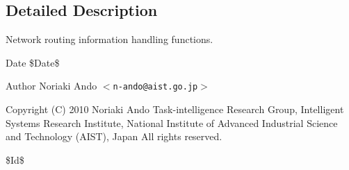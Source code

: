 \subsection{Detailed Description}
Network routing information handling functions. \begin{DoxyDate}{Date}
\$Date\$ 
\end{DoxyDate}
\begin{DoxyAuthor}{Author}
Noriaki Ando $<${\tt n-\/ando@aist.go.jp}$>$
\end{DoxyAuthor}
Copyright (C) 2010 Noriaki Ando Task-\/intelligence Research Group, Intelligent Systems Research Institute, National Institute of Advanced Industrial Science and Technology (AIST), Japan All rights reserved.

\$Id\$ 